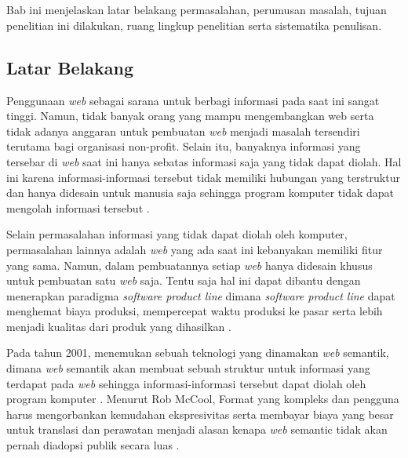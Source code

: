\chapter{\babSatu}

Bab ini menjelaskan latar belakang permasalahan, perumusan masalah, tujuan penelitian ini dilakukan, ruang lingkup penelitian serta sistematika penulisan.

\section{Latar Belakang}

Penggunaan \textit{web} sebagai sarana untuk berbagi informasi pada saat ini sangat tinggi. Namun, tidak banyak orang yang mampu mengembangkan web serta tidak adanya anggaran untuk pembuatan \textit{web} menjadi masalah tersendiri terutama bagi organisasi non-profit. Selain itu, banyaknya informasi yang tersebar di \textit{web} saat ini hanya sebatas informasi saja yang tidak dapat diolah. Hal ini karena informasi-informasi tersebut tidak memiliki hubungan yang terstruktur dan hanya didesain untuk manusia saja sehingga program komputer tidak dapat mengolah informasi tersebut \citep{berners.semantic}.

Selain permasalahan informasi yang tidak dapat diolah oleh komputer, permasalahan lainnya adalah \textit{web} yang ada saat ini kebanyakan memiliki fitur yang sama. Namun, dalam pembuatannya setiap \textit{web} hanya didesain khusus untuk pembuatan satu \textit{web} saja. Tentu saja hal ini dapat dibantu dengan menerapkan paradigma \textit{software product line} dimana \textit{software product line} dapat menghemat biaya produksi, mempercepat waktu produksi ke pasar serta lebih menjadi kualitas dari produk yang dihasilkan \citep{book.sple}.

Pada tahun 2001, \cite{berners.semantic} menemukan sebuah teknologi yang dinamakan \textit{web} semantik, dimana \textit{web} semantik akan membuat sebuah struktur untuk informasi yang terdapat pada \textit{web} sehingga informasi-informasi tersebut dapat diolah oleh program komputer \citep{berners.semantic}. Menurut Rob McCool, Format yang kompleks dan pengguna harus mengorbankan kemudahan ekspresivitas serta membayar biaya yang besar untuk translasi dan perawatan menjadi alasan kenapa \textit{web} semantic tidak akan pernah diadopsi publik secara luas \citep{pragmatic.web}.

